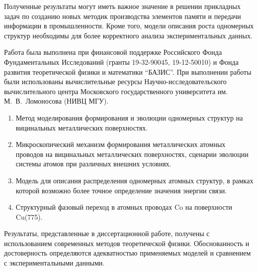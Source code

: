 Полученные результаты могут иметь важное значение в решении прикладных задач по созданию новых методик производства элементов памяти и передачи информации в промышленности. Кроме того, модели описания роста одномерных структур необходимы для более корректного анализа экспериментальных данных.

Работа была  выполнена при финансовой поддержке Российского Фонда Фундаментальных Исследований (гранты 19-32-90045, 19-12-50010) и Фонда развития теоретической физики и математики ``БАЗИС''. При выполнении работы были использованы вычислительные ресурсы Научно-исследовательского вычислительного центра Московского государственного университета им. М.~В.~Ломоносова (НИВЦ МГУ).


\begin{enumerate}
	\item Метод моделирования формирования и эволюции одномерных структур на вицинальных металлических поверхностях.
	\item Микроскопический механизм формирования металлических атомных проводов на вицинальных металлических поверхностях, сценарии эволюции системы атомов при различных внешних условиях.
	\item Модель для описания распределения одномерных атомных структур, в рамках которой возможно более точное определение значения энергии связи.
	\item Структурный фазовый переход в атомных проводах Co на поверхности Cu(775).
\end{enumerate}

Результаты, представленные в диссертационной работе, получены с использованием  современных методов теоретической физики. Обоснованность и достоверность определяются адекватностью применяемых моделей и сравнением с экспериментальными данными.

